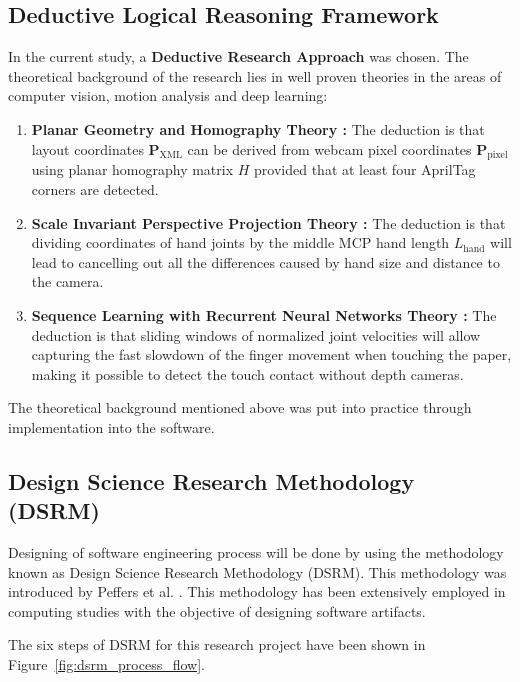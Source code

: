 \subsection{Deductive Logical Reasoning Framework}
\label{subsec:meth_deductive_approach}
In the current study, a \textbf{Deductive Research Approach} was chosen. The theoretical background of the research lies in well proven theories in the areas of computer vision, motion analysis and deep learning:
\begin{enumerate}
    \item \textbf{Planar Geometry and Homography Theory \cite{LonguetHiggins1985Machine, Pirchheim2011Homography}:} The deduction is that layout coordinates $\mathbf{P}_{\text{XML}}$ can be derived from webcam pixel coordinates $\mathbf{P}_{\text{pixel}}$ using planar homography matrix $H$ provided that at least four AprilTag corners are detected.
    \item \textbf{Scale Invariant Perspective Projection Theory \cite{Doan2022Efficient}:} The deduction is that dividing coordinates of hand joints by the middle MCP hand length $L_{\text{hand}}$ will lead to cancelling out all the differences caused by hand size and distance to the camera.
    \item \textbf{Sequence Learning with Recurrent Neural Networks Theory \cite{Hochreiter1997LSTM}:} The deduction is that sliding windows of normalized joint velocities will allow capturing the fast slowdown of the finger movement when touching the paper, making it possible to detect the touch contact without depth cameras.
\end{enumerate}

The theoretical background mentioned above was put into practice through implementation into the software.

\subsection{Design Science Research Methodology (DSRM)}
\label{subsec:meth_dsrm_framework}
Designing of software engineering process will be done by using the methodology known as Design Science Research Methodology (DSRM). This methodology was introduced by Peffers et al. \cite{ReviewVirtualKeyboard2020}. This methodology has been extensively employed in computing studies with the objective of designing software artifacts.

The six steps of DSRM for this research project have been shown in Figure~\ref{fig:dsrm_process_flow}.

